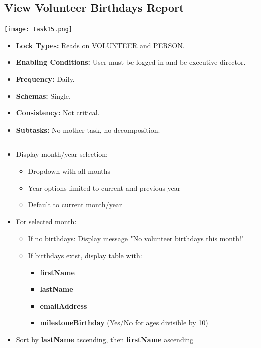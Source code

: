 \documentclass{article}
\begin{document}
\subsection{View Volunteer Birthdays Report}
\begin{center}
    \texttt{[image: task15.png]}
\end{center}
\begin{itemize}
    \item \textbf{Lock Types:} Reads on VOLUNTEER and PERSON.
    \item \textbf{Enabling Conditions:} User must be logged in and be executive director.
    \item \textbf{Frequency:} Daily.
    \item \textbf{Schemas:} Single.
    \item \textbf{Consistency:} Not critical.
    \item \textbf{Subtasks:} No mother task, no decomposition.
\end{itemize}
\noindent\rule{8cm}{0.4pt}
\begin{itemize}
    \item Display month/year selection:
    \begin{itemize}
        \item Dropdown with all months
        \item Year options limited to current and previous year
        \item Default to current month/year
    \end{itemize}
    \item For selected month:
    \begin{itemize}
        \item If no birthdays: Display message "No volunteer birthdays this month!"
        \item If birthdays exist, display table with:
        \begin{itemize}
            \item \textbf{firstName}
            \item \textbf{lastName}
            \item \textbf{emailAddress}
            \item \textbf{milestoneBirthday} (Yes/No for ages divisible by 10)
        \end{itemize}
    \end{itemize}
    \item Sort by \textbf{lastName} ascending, then \textbf{firstName} ascending
\end{itemize}
\end{document}
